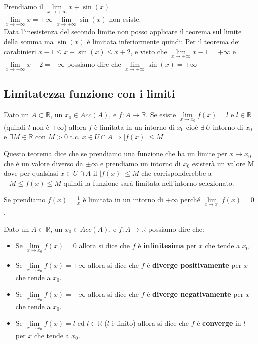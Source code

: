 \begin{example}
Prendiamo il $\lim\limits_{x\to +\infty}x + \sin(x)$\\
$\lim\limits_{x\to +\infty}x = +\infty$ \hspace{.5cm} $\lim\limits_{x\to +\infty}\sin(x)$ non esiste.\\
Data l'inesistenza del secondo limite non posso applicare il teorema sul limite della somma ma $\sin(x)$ è limitata inferiormente quindi:
Per il teorema dei carabinieri $x - 1 \leq x + \sin(x) \leq x + 2$, e visto che $\lim\limits_{x\to +\infty}x - 1 = +\infty$ e $\lim\limits_{x\to +\infty}x + 2 = +\infty$ possiamo dire che $\lim\limits_{x\to +\infty}\sin(x) = +\infty$
\end{example}

\subsection{Limitatezza funzione con i limiti}
\begin{theorem}
    Dato un $A \subset \mathbb{R}$, un $x_0 \in Acc(A)$, e $f: A \to \mathbb{R}$. Se esiste $\lim\limits_{x\to x_0}f(x) = l$ e $l \in \mathbb{R}$ (quindi $l$ non è $\pm\infty$) allora $f$ è limitata in un intorno di $x_0$ cioè $\exists \: U$ intorno di $x_0$ e $\exists M \in \mathbb{R}$ con $M > 0$ t.c. $x \in U \cap A \Longrightarrow |f(x)| \leq M$.
\end{theorem}
Questo teorema dice che se prendiamo una funzione che ha un limite per $x\to x_0$ che è un valore diverso da $\pm\infty$ e prendiamo un intorno di $x_0$ esisterà un valore M dove per qualsiasi $x \in U \cap A$ il $|f(x)| \leq M$ che corrisponderebbe a $-M \leq f(x) \leq M$ quindi la funzione sarà limitata nell'intorno selezionato.
\begin{example}
Se prendiamo $f(x) = \frac{1}{x}$ è limitata in un intorno di $+\infty$ perché $\lim\limits_{x\to x_0}f(x) = 0$.
\end{example}

\begin{definition}
Dato un $A \subset \mathbb{R}$, un $x_0 \in Acc(A)$, e $f: A \to \mathbb{R}$ possiamo dire che:
\begin{itemize}
    \item Se $\lim\limits_{x\to x_0}f(x) = 0$ allora si dice che $f$ è \textbf{infinitesima} per $x$ che tende a $x_0$.
    \item Se $\lim\limits_{x\to x_0}f(x) = +\infty$ allora si dice che $f$ è \textbf{diverge positivamente} per $x$ che tende a $x_0$.
    \item Se $\lim\limits_{x\to x_0}f(x) = -\infty$ allora si dice che $f$ è \textbf{diverge negativamente} per $x$ che tende a $x_0$.
    \item Se $\lim\limits_{x\to x_0}f(x) = l$ ed $l \in \mathbb{R}$ ($l$ è finito) allora si dice che $f$ è \textbf{converge} in $l$ per $x$ che tende a $x_0$.
\end{itemize}
\end{definition}

